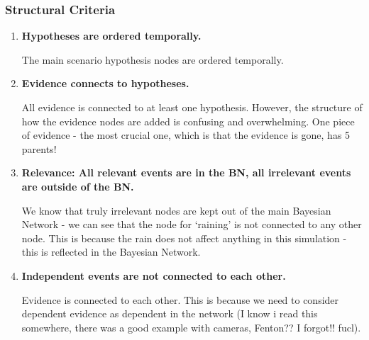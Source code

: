 \subsubsection{Structural Criteria}
\begin{enumerate}
\item \textbf{Hypotheses are ordered temporally.}

The main scenario hypothesis nodes are ordered temporally.

\item \textbf{Evidence connects to hypotheses.}

All evidence is connected to at least one hypothesis. However, the structure of how the evidence nodes are added is confusing and overwhelming. One piece of evidence - the most crucial one, which is that the evidence is gone, has 5 parents!

\item \textbf{Relevance: All relevant events are in the BN, all irrelevant events are outside of the BN.}

We know that truly irrelevant nodes are kept out of the main Bayesian Network - we can see that the node for `raining' is not connected to any other node. This is because the rain does not affect anything in this simulation - this is reflected in the Bayesian Network.

\item \textbf{Independent events are not connected to each other.}

Evidence is connected to each other. This is because we need to consider dependent evidence as dependent in the network (I know i read this somewhere, there was a good example with cameras, Fenton?? I forgot!! fucl). 

\end{enumerate}


